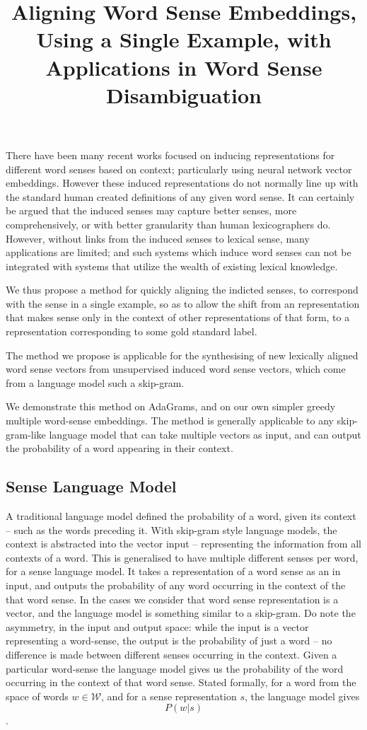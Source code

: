 \documentclass{sig-alternate}
\newcommand{\W}{\mathcal{W}}
\begin{document}
\title{Aligning Word Sense Embeddings, Using a Single Example, with Applications in Word Sense Disambiguation}
\maketitle


There have been many recent works focused on inducing representations for different word senses based on context; particularly using neural network vector embeddings.
However these induced representations do not normally line up with the standard human created definitions of any given word sense.
It can certainly be argued that the induced senses may capture better senses, more comprehensively, or with better granularity than human lexicographers do.
However, without links from the induced senses to lexical sense, many applications are limited; and such systems which induce word senses can not be integrated with systems that utilize the wealth of existing lexical knowledge.

We thus propose a method for quickly aligning the indicted senses, to correspond with the sense in a single example, so as to allow the shift from an representation that makes sense only in the context of other representations of that form, to a representation corresponding to some gold standard label.

The method we propose is applicable for the synthesising of new lexically aligned word sense vectors from unsupervised induced word sense vectors, which come from a language model such a skip-gram.



We demonstrate this method on AdaGrams\cite{AdaGrams}, and on our own simpler greedy multiple word-sense embeddings. The method is generally applicable to any skip-gram-like language model that can take multiple vectors as input, and can output the probability of a word appearing in their context.

\subsection{Sense Language Model}
A traditional language model defined the probability of a word, given its context -- such as the words preceding it.
With skip-gram style language models, the context is abstracted into the vector input -- representing the information from all contexts of a word. This is generalised to have multiple different senses per word, for a sense language model.
It takes a representation of a word sense as an in input, and outputs the probability of any word occurring in the context of the that word sense. In the cases we consider that word sense representation is a vector, and the language model is something similar to a skip-gram. Do note the asymmetry, in the input and output space: while the input is a vector representing a word-sense, the output is the probability of just a word -- no difference is made between different senses occurring in the context. Given a particular word-sense the language model gives us the probability of the word occurring in the context of that word sense. Stated formally, for a word from the space of words $w\in \W$, and for a sense representation $s$, the language model gives $$P(w | s)$$.
\end{document}
